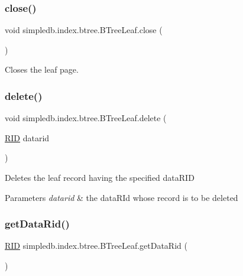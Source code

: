\subsubsection{\texorpdfstring{close()}{close()}}
{\footnotesize\ttfamily void simpledb.\+index.\+btree.\+B\+Tree\+Leaf.\+close (\begin{DoxyParamCaption}{ }\end{DoxyParamCaption})\hspace{0.3cm}{\ttfamily [inline]}}

Closes the leaf page. \mbox{\label{classsimpledb_1_1index_1_1btree_1_1BTreeLeaf_a1fda546b620e8ec27ed9d33579926c6b}} 
\subsubsection{\texorpdfstring{delete()}{delete()}}
{\footnotesize\ttfamily void simpledb.\+index.\+btree.\+B\+Tree\+Leaf.\+delete (\begin{DoxyParamCaption}\item[{\hyperlink{classsimpledb_1_1record_1_1RID}{R\+ID}}]{datarid }\end{DoxyParamCaption})\hspace{0.3cm}{\ttfamily [inline]}}

Deletes the leaf record having the specified data\+R\+ID 
\begin{DoxyParams}{Parameters}
{\em datarid} & the data\+R\+Id whose record is to be deleted \\
\hline
\end{DoxyParams}
\mbox{\label{classsimpledb_1_1index_1_1btree_1_1BTreeLeaf_a79b4f0a4d4e9480d9cfdeb64298a0b53}} 
\subsubsection{\texorpdfstring{get\+Data\+Rid()}{getDataRid()}}
{\footnotesize\ttfamily \hyperlink{classsimpledb_1_1record_1_1RID}{R\+ID} simpledb.\+index.\+btree.\+B\+Tree\+Leaf.\+get\+Data\+Rid (\begin{DoxyParamCaption}{ }\end{DoxyParamCaption})\hspace{0.3cm}{\ttfamily [inline]}}

